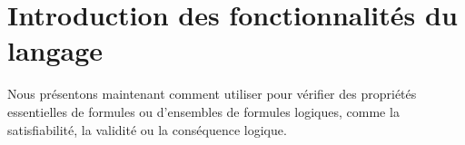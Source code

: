 


\section{Introduction des fonctionnalités du langage \touist}\label{chap:touist:touist}



Nous présentons maintenant comment utiliser \touist pour vérifier des propriétés essentielles de formules ou d'ensembles de formules logiques, comme la satisfiabilité, la validité ou la conséquence logique.

